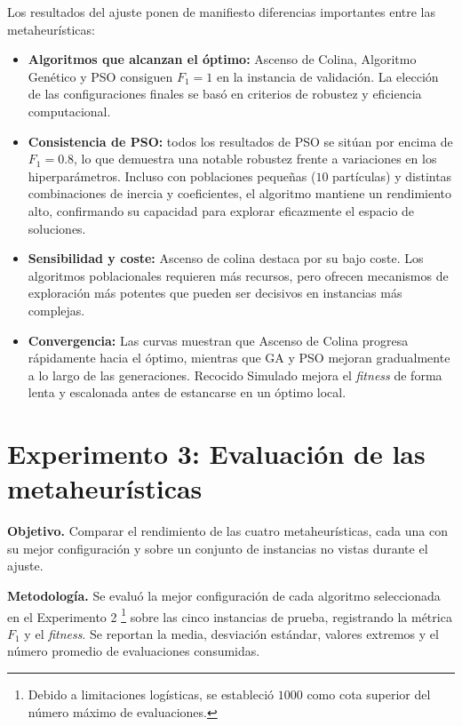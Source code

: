 \documentclass[letterpaper, 12pt]{report}
\begin{document}
Los resultados del ajuste ponen de manifiesto diferencias importantes entre las metaheurísticas:

\begin{itemize}
    \item \textbf{Algoritmos que alcanzan el óptimo:} Ascenso de Colina, Algoritmo Genético y PSO consiguen \(F_1 = 1\) en la instancia de validación. La elección de las configuraciones finales se basó en criterios de robustez y eficiencia computacional.

    \item \textbf{Consistencia de PSO:} todos los resultados de PSO se sitúan por encima de \(F_1 = 0.8\), lo que demuestra una notable robustez frente a variaciones en los hiperparámetros. Incluso con poblaciones pequeñas (\(10\) partículas) y distintas combinaciones de inercia y coeficientes, el algoritmo mantiene un rendimiento alto, confirmando su capacidad para explorar eficazmente el espacio de soluciones.

    \item \textbf{Sensibilidad y coste:} Ascenso de colina destaca por su bajo coste. Los algoritmos poblacionales requieren más recursos, pero ofrecen mecanismos de exploración más potentes que pueden ser decisivos en instancias más complejas.

    \item \textbf{Convergencia:} Las curvas muestran que Ascenso de Colina progresa rápidamente hacia el óptimo, mientras que GA y PSO mejoran gradualmente a lo largo de las generaciones. Recocido Simulado mejora el \textit{fitness} de forma lenta y escalonada antes de estancarse en un óptimo local.
\end{itemize}

\section{Experimento 3: Evaluación de las metaheurísticas}

\medskip
\noindent
\textbf{Objetivo.}
Comparar el rendimiento de las cuatro metaheurísticas, cada una con su mejor configuración y sobre un conjunto de instancias no vistas durante el ajuste.

\medskip
\noindent
\textbf{Metodología.}
Se evaluó la mejor configuración de cada algoritmo seleccionada en el Experimento 2 \footnote{Debido a limitaciones logísticas, se estableció $1000$ como cota superior del número máximo de evaluaciones.} sobre las cinco instancias de prueba, registrando la métrica \(F_1\) y el \textit{fitness}. Se reportan la media, desviación estándar, valores extremos y el número promedio de evaluaciones consumidas.
\end{document}

